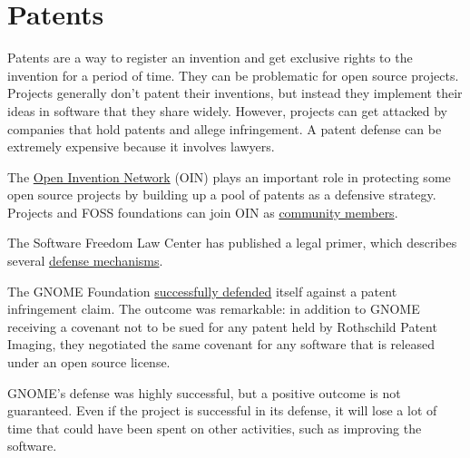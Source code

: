 


\chapter{Patents}

Patents are a way to register an invention and get exclusive rights to the invention for a period of time.  They can be problematic for open source projects.  Projects generally don't patent their inventions, but instead they implement their ideas in software that they share widely.  However, projects can get attacked by companies that hold patents and allege infringement.  A patent defense can be extremely expensive because it involves lawyers.

The \href{https://openinventionnetwork.com/}{Open Invention Network} (OIN) plays an important role in protecting some open source projects by building up a pool of patents as a defensive strategy.  Projects and FOSS foundations can join OIN as \href{https://openinventionnetwork.com/our-members/community-members/}{community members}.

The Software Freedom Law Center has published a legal primer, which describes several \href{https://www.softwarefreedom.org/resources/2008/foss-primer.html#x1-390004}{defense mechanisms}.

\begin{kaobox}[frametitle=Patent case against GNOME]

The GNOME Foundation \href{https://foundation.gnome.org/2020/05/20/patent-case-against-gnome-resolved/}{successfully defended} itself against a patent infringement claim.  The outcome was remarkable: in addition to GNOME receiving a covenant not to be sued for any patent held by Rothschild Patent Imaging, they negotiated the same covenant for any software that is released under an open source license.

GNOME's defense was highly successful, but a positive outcome is not guaranteed.  Even if the project is successful in its defense, it will lose a lot of time that could have been spent on other activities, such as improving the software.

\end{kaobox}

